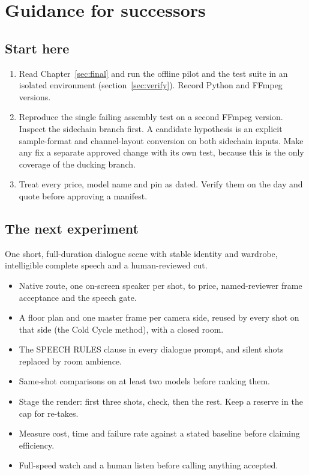 \documentclass[11pt,a4paper]{article}
\newcommand{\code}[1]{\texttt{\detokenize{#1}}}
\begin{document}
\section{Guidance for successors}
\label{sec:guide}
\subsection{Start here}
\begin{enumerate}
\item Read Chapter~\ref{sec:final} and run the offline pilot and the test suite in an isolated environment (section~\ref{sec:verify}). Record Python and FFmpeg versions.
\item Reproduce the single failing assembly test on a second FFmpeg version. Inspect the sidechain branch first. A candidate hypothesis is an explicit sample-format and channel-layout conversion on both sidechain inputs. Make any fix a separate approved change with its own test, because this is the only coverage of the ducking branch.
\item Treat every price, model name and pin as dated. Verify them on the day and quote before approving a manifest.
\end{enumerate}

\subsection{The next experiment}
One short, full-duration dialogue scene with stable identity and wardrobe, intelligible complete speech and a human-reviewed cut.
\begin{itemize}
\item Native route, one on-screen speaker per shot, \code{plan-native} to price, named-reviewer frame acceptance and the speech gate.
\item A floor plan and one master frame per camera side, reused by every shot on that side (the Cold Cycle method), with a closed room.
\item The SPEECH RULES clause in every dialogue prompt, and silent shots replaced by room ambience.
\item Same-shot comparisons on at least two models before ranking them.
\item Stage the render: first three shots, check, then the rest. Keep a reserve in the cap for re-takes.
\item Measure cost, time and failure rate against a stated baseline before claiming efficiency.
\item Full-speed watch and a human listen before calling anything accepted.
\end{itemize}
\end{document}
